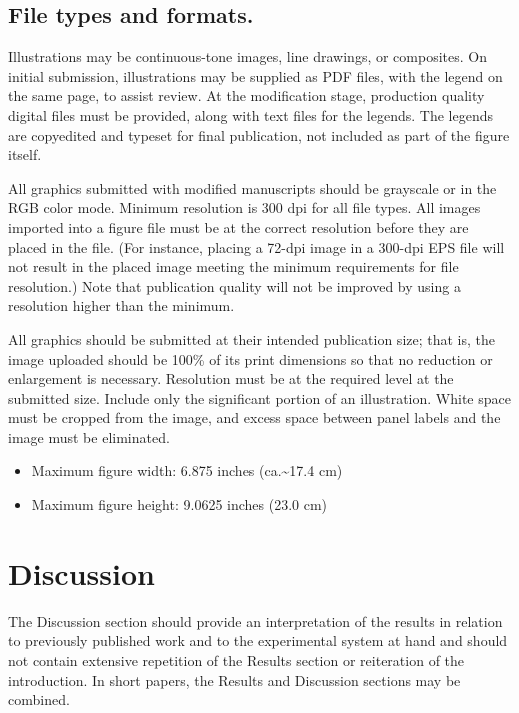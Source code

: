 \documentclass[
  lineno]{asm}
\providecommand{\tightlist}{%
  \setlength{\itemsep}{0pt}\setlength{\parskip}{0pt}}\usepackage{longtable,booktabs,array}
\begin{document}
\subsection{File types and formats.}\label{file-types-and-formats.}

Illustrations may be continuous-tone images, line drawings, or
composites. On initial submission, illustrations may be supplied as PDF
files, with the legend on the same page, to assist review. At the
modification stage, production quality digital files must be provided,
along with text files for the legends. The legends are copyedited and
typeset for final publication, not included as part of the figure
itself.

All graphics submitted with modified manuscripts should be grayscale or
in the RGB color mode. Minimum resolution is 300 dpi for all file types.
All images imported into a figure file must be at the correct resolution
before they are placed in the file. (For instance, placing a 72-dpi
image in a 300-dpi EPS file will not result in the placed image meeting
the minimum requirements for file resolution.) Note that publication
quality will not be improved by using a resolution higher than the
minimum.

All graphics should be submitted at their intended publication size;
that is, the image uploaded should be 100\% of its print dimensions so
that no reduction or enlargement is necessary. Resolution must be at the
required level at the submitted size. Include only the significant
portion of an illustration. White space must be cropped from the image,
and excess space between panel labels and the image must be eliminated.

\begin{itemize}
\tightlist
\item
  Maximum figure width: 6.875 inches (ca.\textasciitilde17.4 cm)
\item
  Maximum figure height: 9.0625 inches (23.0 cm)
\end{itemize}

\section{Discussion}\label{discussion}

The Discussion section should provide an interpretation of the results
in relation to previously published work and to the experimental system
at hand and should not contain extensive repetition of the Results
section or reiteration of the introduction. In short papers, the Results
and Discussion sections may be combined.
\end{document}
